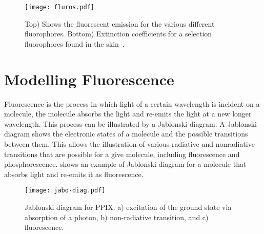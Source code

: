 

\begin{figure}[!htbp]
  \centering
  \texttt{[image: fluros.pdf]}
  \caption{Top) Shows the fluorescent emission for the various different fluorophores. Bottom) Extinction coefficients for a selection fluorophores found in the skin~\cite{prahltyro,prahltryto,soltani2019deep,sun2012biomarkers,islam2013ph,evans2013magnetic,von2012fluorescence,dacosta2003molecular}.}
  \label{fig:flurosshow}
\end{figure}
\FloatBarrier

\section{Modelling Fluorescence}

Fluorescence is the process in which light of a certain wavelength is incident on a molecule, the molecule absorbs the light and re-emits the light at a new longer wavelength.
This process can be illustrated by a Jablonski diagram.
A Jablonski diagram shows the electronic states of a molecule and the possible transitions between them.
This allows the illustration of various radiative and nonradiative transitions that are possible for a give  molecule, including fluorescence and phosphorescence.
 shows an example of Jablonski diagram for a molecule that absorbs light and re-emits it as fluorescence.

\begin{figure}[!htpb]
	\centering
	\texttt{[image: jabo-diag.pdf]}
	\caption{Jablonski diagram for PPIX. a) excitation of the ground state via absorption of a photon, b) non-radiative transition, and c) fluorescence.}
	\label{fig:Jabo}
\end{figure}

